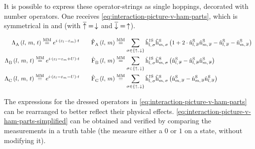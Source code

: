 It is possible to express these operator-strings as single hoppings, decorated with number operators. One receives \autoref{eq:interaction-picture-v-ham-parts}, which is symmetrical in \up and \down (with $\overline{\uparrow} = \,\downarrow$ and  $\overline{\downarrow} = \,\uparrow$).

\begin{equation}
    \label{eq:interaction-picture-v-ham-parts}
    \begin{split}
        \VhamiltonianAnalyticalPart{A}{l}{m}{t} \stackrel{\text{MM}}{=} e^{i\cdot \left(\epsl-\epsl[m]\right)\cdot t} \qquad
        \VhamiltonianOperatorPart{A}{l}{m} &\stackrel{\text{MM}}{=} 
        \lsum[\sigma \in \left\{\up,\,\down\right\}]
        \withspinhcop[\schroedingerPicture]{l}{\sigma}{\dagger}\withspinhcop[\schroedingerPicture]{m}{\sigma}{}
        \left(
            1+
            2 \cdot \nop[\schroedingerPicture]{l}{\overline{\sigma}}\nop[\schroedingerPicture]{m}{\overline{\sigma}}
            - \nop[\schroedingerPicture]{l}{\overline{\sigma}}
            - \nop[\schroedingerPicture]{m}{\overline{\sigma}}
        \right)
        \\
        \VhamiltonianAnalyticalPart{B}{l}{m}{t} \stackrel{\text{MM}}{=} e^{i\cdot \left(\epsl-\epsl[m] + U\right)\cdot t} \qquad
        \VhamiltonianOperatorPart{B}{l}{m} &\stackrel{\text{MM}}{=} 
        \lsum[\sigma \in \left\{\up,\,\down\right\}]        
        \withspinhcop[\schroedingerPicture]{l}{\sigma}{\dagger}\withspinhcop[\schroedingerPicture]{m}{\sigma}{}
        \left(
            \nop[\schroedingerPicture]{l}{\overline{\sigma}}
            - \nop[\schroedingerPicture]{l}{\overline{\sigma}}\nop[\schroedingerPicture]{m}{\overline{\sigma}}
        \right)
        \\
        \VhamiltonianAnalyticalPart{C}{l}{m}{t} \stackrel{\text{MM}}{=} e^{i\cdot \left(\epsl-\epsl[m] - U\right)\cdot t} \qquad
        \VhamiltonianOperatorPart{C}{l}{m} &\stackrel{\text{MM}}{=} 
        \lsum[\sigma \in \left\{\up,\,\down\right\}]
        \withspinhcop[\schroedingerPicture]{l}{\sigma}{\dagger}\withspinhcop[\schroedingerPicture]{m}{\sigma}{}
        \left(
            \nop[\schroedingerPicture]{m}{\overline{\sigma}}
            - \nop[\schroedingerPicture]{m}{\overline{\sigma}}\nop[\schroedingerPicture]{l}{\overline{\sigma}}
        \right)
        \\
    \end{split}
\end{equation}

The expressions for the dressed operators in \autoref{eq:interaction-picture-v-ham-parts} can be rearranged to better reflect their physical effects.
\autoref{eq:interaction-picture-v-ham-parts-simplified} can be obtained and verified by comparing the measurements in a truth table (the \nop[\schroedingerPicture]{\ast}{\ast} measure either a $0$ or $1$ on a state, without modifying it).

